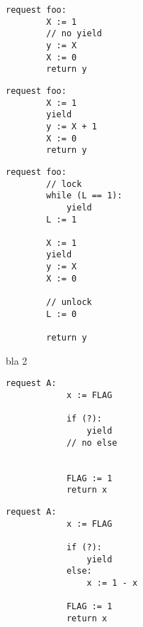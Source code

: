 \noindent
\begin{minipage}[t]{0.45\textwidth}
	\begin{minipage}[t]{\textwidth}
		\begin{lstlisting}[caption={Without yield or lock (serializable)}]
    request foo: 
        X := 1 
        // no yield
        y := X 
        X := 0
        return y 
		\end{lstlisting}
	\end{minipage}
	\vspace{1em}
	\begin{minipage}[t]{\textwidth}
		\begin{lstlisting}[caption={With yield (not serializable)}]
    request foo: 
        X := 1 
        yield 
        y := X + 1
        X := 0
        return y 	
		\end{lstlisting}
	\end{minipage}
\end{minipage}%
\hfill
\begin{minipage}[t]{0.45\textwidth}
	\begin{lstlisting}[caption={With yield and lock (serializable)}]
    request foo: 
        // lock
        while (L == 1): 
            yield
        L := 1 

        X := 1
        yield
        y := X 
        X := 0

        // unlock    
        L := 0

        return y 
	\end{lstlisting}
\end{minipage}

\vspace{2em}
bla 2

\noindent
\begin{minipage}[t]{0.45\textwidth}
	\begin{lstlisting}[caption={Not serializable: {(A,0),(A,0)}}]
		request A: 
		    x := FLAG 
		
		    if (?): 
		        yield
		    // no else
		
		
		    FLAG := 1 
		    return x
	\end{lstlisting}
\end{minipage}%
\hfill
\begin{minipage}[t]{0.45\textwidth}
	\begin{lstlisting}[caption={Serializable}]
		request A: 
		    x := FLAG
		
		    if (?):
		        yield
		    else:
		        x := 1 - x
		
		    FLAG := 1
		    return x
	\end{lstlisting}
\end{minipage}

